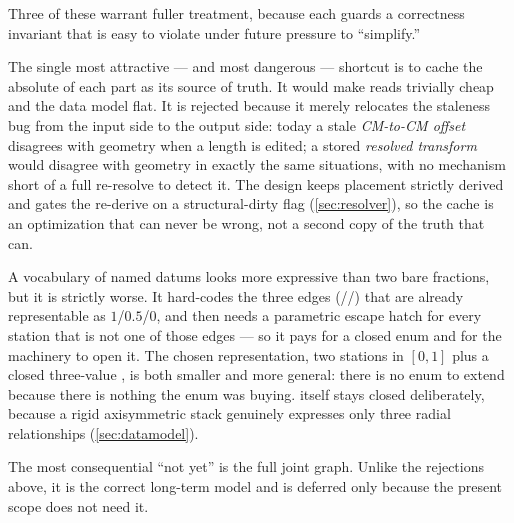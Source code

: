 Three of these warrant fuller treatment, because each guards a correctness invariant that
is easy to violate under future pressure to ``simplify.''

\begin{rejected}
The single most attractive --- and most dangerous --- shortcut is to cache the absolute
 of each part as its source of truth. It would make reads trivially cheap and
the data model flat. It is rejected because it merely relocates the staleness bug from the
input side to the output side: today a stale \emph{CM-to-CM offset} disagrees with geometry
when a length is edited; a stored \emph{resolved transform} would disagree with geometry in
exactly the same situations, with no mechanism short of a full re-resolve to detect it. The
design keeps placement strictly derived and gates the re-derive on a structural-dirty flag
(\cref{sec:resolver}), so the cache is an optimization that can never be wrong, not a second
copy of the truth that can.
\end{rejected}

\begin{rejected}
A vocabulary of named datums looks more expressive than two bare fractions, but it is
strictly worse. It hard-codes the three edges (//) that are
already representable as $1$/$0.5$/$0$, and then needs a parametric escape hatch for every
station that is not one of those edges --- so it pays for a closed enum and for the machinery
to open it. The chosen representation, two stations in $[0,1]$ plus a closed three-value
, is both smaller and more general: there is no enum to extend because there
is nothing the enum was buying.  itself stays closed deliberately, because a
rigid axisymmetric stack genuinely expresses only three radial relationships (\cref{sec:datamodel}).
\end{rejected}

The most consequential ``not yet'' is the full joint graph. Unlike the rejections above, it
is the correct long-term model and is deferred only because the present scope does not need
it.

